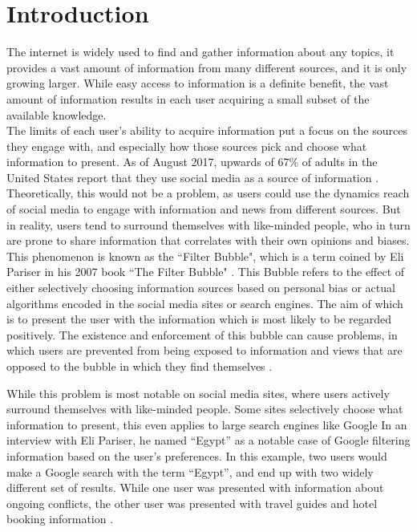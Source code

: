 \chapter{Introduction}
The internet is widely used to find and gather information about any topics, it
provides a vast amount of information from many different sources, and it is
only growing larger.
While easy access to information is a definite benefit, the vast amount of
information results in each user acquiring a small subset of the available
knowledge.\\
The limits of each user's ability to acquire information put a focus on the
sources they engage with, and especially how those sources pick and choose what
information to present.
As of August 2017, upwards of 67\% of adults in the United States report that
they use social media as a source of information \citep{journalism2017}.
Theoretically, this would not be a problem, as users could use the dynamics
reach of social media to engage with information and news from different
sources. But in reality, users tend to surround themselves with like-minded
people, who in turn are prone to share information that correlates with their
own opinions and biases.\\

This phenomenon is known as the ``Filter Bubble", which is a term coined by Eli
Pariser in his 2007 book ``The Filter Bubble" \citep{pariser2011filter}.
This Bubble refers to the effect of either selectively choosing information
sources based on personal bias or actual algorithms encoded in the social media
sites or search engines.
The aim of which is to present the user with the information which is most
likely to be regarded positively.
The existence and enforcement of this bubble can cause problems, in which users
are prevented from being exposed to information and views that are opposed to
the bubble in which they find themselves
\citep[p.59-73]{pariser2011filter}.\nl

While this problem is most notable on social media sites, where users actively
surround themselves with like-minded people. Some sites selectively choose what
information to present, this even applies to large search engines like Google
\citep{filterBubbleDef} \citep{Personality} In an interview with Eli Pariser, he
named ``Egypt'' as a notable case of Google filtering information based on the
user's preferences. In this example, two users would make a Google search with
the term ``Egypt'', and end up with two widely different set of results.
While one user was presented with information about ongoing conflicts, the other
user was presented with travel guides and hotel booking information
\citep{nusSduSearch}.